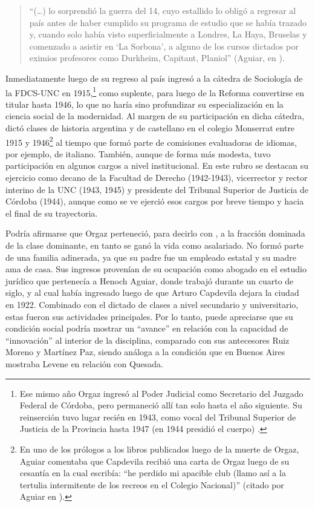 \begin{quote}
\enquote{(\dots) lo sorprendió la guerra del 14, cuyo estallido lo obligó a regresar al país antes de haber cumplido su programa de estudio que se había trazado y, cuando solo había visto superficialmente a Londres, La Haya, Bruselas y comenzado a asistir en \enquote{La Sorbona}, a alguno de los cursos dictados por eximios profesores como Durkheim, Capitant, Planiol} (Aguiar, en \cite[10]{1544-ORGAZ1960}).
\end{quote}

Inmediatamente luego de su regreso al país ingresó a la cátedra de Sociología de la FDCS-UNC en 1915,\footnote{Ese mismo año Orgaz ingresó al Poder Judicial como Secretario del Juzgado Federal de Córdoba, pero permaneció allí tan solo hasta el año siguiente. Su reinserción tuvo lugar recién en 1943, como vocal del Tribunal Superior de Justicia de la Provincia hasta 1947 (en 1944 presidió el cuerpo) \parencite{1528-REQUENA2010}.} como suplente, para luego de la Reforma convertirse en titular hasta 1946, lo que no haría sino profundizar su especialización en la ciencia social de la modernidad. Al margen de su participación en dicha cátedra, dictó clases de historia argentina y de castellano en el colegio Monserrat entre 1915 y 1946\footnote{En uno de los prólogos a los libros publicados luego de la muerte de Orgaz, Aguiar comentaba que Capdevila recibió una carta de Orgaz luego de su cesantía en la cual escribía: \enquote{he perdido mi apacible club (llamo así a la tertulia intermitente de los recreos en el Colegio Nacional)} (citado por Aguiar en \cite[20]{1545-ORGAZ1950}).} al tiempo que formó parte de comisiones evaluadoras de idiomas, por ejemplo, de italiano. También, aunque de forma más modesta, tuvo participación en algunos cargos a nivel institucional. En este rubro se destacan su ejercicio como decano de la Facultad de Derecho (1942-1943), vicerrector y rector interino de la UNC (1943, 1945) y presidente del Tribunal Superior de Justicia de Córdoba (1944), aunque como se ve ejerció esos cargos por breve tiempo y hacia el final de su trayectoria.

Podría afirmarse que Orgaz perteneció, para decirlo con \textcite{1576-BOURDIEU1999}, a la fracción dominada de la clase dominante, en tanto se ganó la vida como asalariado. No formó parte de una familia adinerada, ya que su padre fue un empleado estatal y su madre ama de casa. Sus ingresos provenían de su ocupación como abogado en el estudio jurídico que pertenecía a Henoch Aguiar, donde trabajó durante un cuarto de siglo, y al cual había ingresado luego de que Arturo Capdevila dejara la ciudad en 1922. Combinado con el dictado de clases a nivel secundario y universitario, estas fueron sus actividades principales. Por lo tanto, puede apreciarse que su condición social podría mostrar un \enquote{avance} en relación con la capacidad de \enquote{innovación} al interior de la disciplina, comparado con sus antecesores Ruiz Moreno y Martínez Paz, siendo análoga a la condición que en Buenos Aires mostraba Levene en relación con Quesada.

